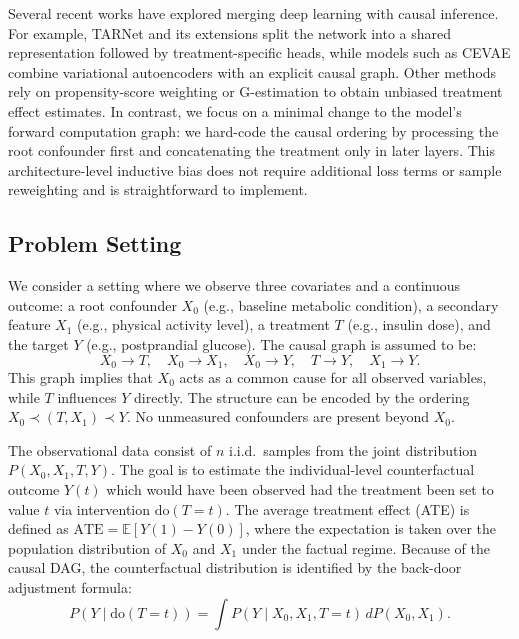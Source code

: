 \documentclass[11pt,a4paper]{article}
\begin{document}
Several recent works have explored merging deep learning with causal inference. For example, TARNet and its extensions split the network into a shared representation followed by treatment-specific heads, while models such as CEVAE combine variational autoencoders with an explicit causal graph. Other methods rely on propensity-score weighting or G-estimation to obtain unbiased treatment effect estimates. In contrast, we focus on a minimal change to the model's forward computation graph: we hard-code the causal ordering by processing the root confounder first and concatenating the treatment only in later layers. This architecture-level inductive bias does not require additional loss terms or sample reweighting and is straightforward to implement.

\subsection{Problem Setting}\label{subsec:problem_setting}
We consider a setting where we observe three covariates and a continuous outcome: a root confounder $X_0$ (e.g., baseline metabolic condition), a secondary feature $X_1$ (e.g., physical activity level), a treatment $T$ (e.g., insulin dose), and the target $Y$ (e.g., postprandial glucose). The causal graph is assumed to be:
\[
X_0 \rightarrow T,\quad X_0 \rightarrow X_1,\quad X_0 \rightarrow Y,\quad T \rightarrow Y,\quad X_1 \rightarrow Y.
\]
This graph implies that $X_0$ acts as a common cause for all observed variables, while $T$ influences $Y$ directly. The structure can be encoded by the ordering $X_0 \prec (T, X_1) \prec Y$. No unmeasured confounders are present beyond $X_0$.

The observational data consist of $n$ i.i.d.\ samples from the joint distribution $P(X_0, X_1, T, Y)$. The goal is to estimate the individual-level counterfactual outcome $Y(t)$ which would have been observed had the treatment been set to value $t$ via intervention $\mathrm{do}(T=t)$. The average treatment effect (ATE) is defined as $\mathrm{ATE} = \mathbb{E}[Y(1) - Y(0)]$, where the expectation is taken over the population distribution of $X_0$ and $X_1$ under the factual regime. Because of the causal DAG, the counterfactual distribution is identified by the back-door adjustment formula:
\[
P(Y \mid \mathrm{do}(T=t)) = \int P(Y \mid X_0, X_1, T=t)\, dP(X_0, X_1).
\]
\end{document}
